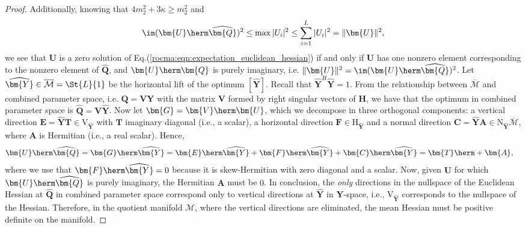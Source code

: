 \begin{proof}
	
	Additionally, knowing that $4m_2^2+3\kappa\geq m_2^2$ and
	\begin{align}
		\im(\bm{U}\herm\widehat{\bm{Q}})^2 \leq \max |U_{i}|^2 \leq \sum_{i=1}^L|U_{i}|^2=\|\bm{U}\|^2, 
	\end{align}
	we see that $\bm{U}$ is a zero solution of Eq.(\ref{rocma:eqn:expectation_euclidean_hessian}) if and only if $\bm{U}$ has one nonzero element corresponding to the nonzero element of $\widehat{\bm{Q}}$, and $\bm{U}\herm\bm{Q}$ is purely imaginary, i.e. $\|\bm{U}\|^2=\im(\bm{U}\herm\widehat{\bm{Q}})^2$. 
	Let $\widehat{\bm{Y}}\in\overline{\mathcal{M}}=\St{L}{1}$ be the horizontal lift of the optimum $[\widehat{\bm{Y}}]$. 
	Recall that
	$\widehat{\bm{Y}}^H \widehat{\bm{Y}}=1$. 
	From the relationship between $\overline{\mathcal{M}}$ and combined parameter space, i.e. $\bm{Q}=\bm{V}\bm{Y}$ with the matrix $\bm{V}$ formed by right singular vectors of $\bm{H}$, we have that the optimum in combined parameter space is  $\widehat{\bm{Q}}=\bm{V}\widehat{\bm{Y}}$.
	Now let $\bm{G}=\bm{V}\herm\bm{U}$, which we decompose in three orthogonal components: a vertical direction $\bm{E}=\widehat{\bm{Y}}\bm{T}\in\mathrm{V}_{\widehat{\bm{Y}}}$ with $\bm{T}$ imaginary diagonal (i.e., a scalar), a horizontal direction $\bm{F}\in\mathrm{H}_{\widehat{\bm{Y}}}$ and a normal direction $\bm{C}=\widehat{\bm{Y}}\bm{A}\in\mathrm{N}_{\widehat{\bm{Y}}}\overline{\mathcal{M}}$, where $\bm{A}$ is Hermitian (i.e., a real scalar). Hence,
	\begin{align}
		\bm{U}\herm\widehat{\bm{Q}}&=\bm{G}\herm\widehat{\bm{Y}}=\bm{E}\herm\widehat{\bm{Y}}+\bm{F}\herm\widehat{\bm{Y}}+\bm{C}\herm\widehat{\bm{Y}}
		=\bm{T}\herm+\bm{A},
	\end{align}
	where we use that $\bm{F}\herm\widehat{\bm{Y}}=0$ because it is skew-Hermitian with zero diagonal and a scalar. Now, given $\bm{U}$ for which $\bm{U}\herm\widehat{\bm{Q}}$ is purely imaginary, the
	Hermitian $\bm{A}$ must be $0$. In conclusion, the \emph{only} directions in the nullspace of the Euclidean Hessian at $\widehat{\bm{Q}}$ in combined parameter space correspond only to vertical directions at $\widehat{\bm{Y}}$ in $\bm{Y}$-space, i.e., $\mathrm{V}_{\widehat{\bm{Y}}}$ corresponds to the nullspace of the Hessian. Therefore, in the quotient manifold $\mathcal{M}$, where the vertical 
	directions are eliminated, the mean Hessian must be positive definite on the manifold. 
					


\end{proof}
